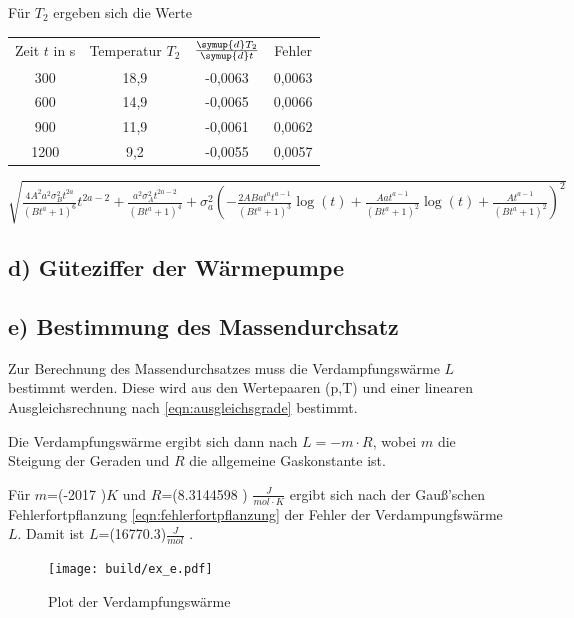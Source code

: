 Für $T_2$ ergeben sich die Werte
\begin{table}
\begin{tabular}{cccc}
	Zeit $t$ in s & Temperatur $T_2$ & $\frac{\symup{d}T_2}{\symup{d}t}$ & Fehler \\
	300 & 18,9 & -0,0063 & 0,0063 \\
	600 & 14,9 & -0,0065 & 0,0066 \\
	900 & 11,9 & -0,0061 & 0,0062 \\
	1200 & 9,2 & -0,0055 & 0,0057 \\
\end{tabular}
\end{table}

$\sqrt{\frac{4 A^{2} a^{2} \sigma_{B}^{2} t^{2 a}}{\left(B t^{a} + 1\right)^{6}} t^{2 a - 2} + \frac{a^{2} \sigma_{A}^{2} t^{2 a - 2}}{\left(B t^{a} + 1\right)^{4}} + \sigma_{a}^{2} \left(- \frac{2 A B a t^{a} t^{a - 1}}{\left(B t^{a} + 1\right)^{3}} \log{\left (t \right )} + \frac{A a t^{a - 1}}{\left(B t^{a} + 1\right)^{2}} \log{\left (t \right )} + \frac{A t^{a - 1}}{\left(B t^{a} + 1\right)^{2}}\right)^{2}}$
\newpage


\subsection{d) Güteziffer der Wärmepumpe}

\subsection{e) Bestimmung des Massendurchsatz}
\label{sec:massendurchsatz}
Zur Berechnung des Massendurchsatzes muss die Verdampfungswärme $L$ bestimmt werden.
Diese wird aus den Wertepaaren (p,T) und einer linearen Ausgleichsrechnung nach \eqref{eqn:ausgleichsgrade} bestimmt.

Die Verdampfungswärme ergibt sich dann nach $ L = −m \cdot R$, wobei $m$ die Steigung der Geraden und $R$ die allgemeine Gaskonstante ist.

Für $m$=(-2017 )$K$ und $R$=(8.3144598 ) $\frac{J}{mol\cdot K}$ \cite{gas}
ergibt sich nach der Gauß’schen Fehlerfortpflanzung \eqref{eqn:fehlerfortpflanzung} der Fehler der Verdampungfswärme $L$.
Damit ist $L$=(16770.3)$\frac{J}{mol}$ .


\begin{figure}
  \centering
  \texttt{[image: build/ex\_e.pdf]}
  \caption{Plot der Verdampfungswärme}
  \label{fig:verdampfungswaerme}
\end{figure}


